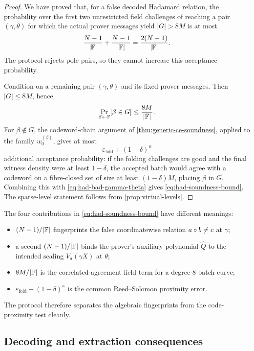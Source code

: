 \begin{proof}
We have proved that, for a false decoded Hadamard relation, the probability over the first two unrestricted field challenges of reaching a pair $(\gamma,\theta)$ for which the actual prover messages yield $|G|>8M$ is at most
\begin{equation}
  \frac{N-1}{|\mathbb{F}|}+\frac{N-1}{|\mathbb{F}|}
  =\frac{2(N-1)}{|\mathbb{F}|}.
  \label{eq:had-bad-gamma-theta}
\end{equation}
The protocol rejects pole pairs, so they cannot increase this acceptance probability.

Condition on a remaining pair $(\gamma,\theta)$ and its fixed prover messages.  Then $|G|\le8M$, hence
\[
  \Pr_{\beta\leftarrow\mathbb{F}}[\beta\in G]\le\frac{8M}{|\mathbb{F}|}.
\]
For $\beta\notin G$, the codeword-chain argument of \cref{thm:generic-ce-soundness}, applied to the family $w_0^{(\beta)}$, gives at most
\[
  \varepsilon_{\mathrm{fold}}+(1-\delta)^\kappa
\]
additional acceptance probability: if the folding challenges are good and the final witness density were at least $1-\delta$, the accepted batch would agree with a codeword on a fibre-closed set of size at least $(1-\delta)M$, placing $\beta$ in $G$.  Combining this with \eqref{eq:had-bad-gamma-theta} gives \eqref{eq:had-soundness-bound}.  The sparse-level statement follows from \cref{prop:virtual-levels}.
\end{proof}

\begin{remark}
\label{rem:had-error-terms}
The four contributions in \eqref{eq:had-soundness-bound} have different meanings:
\begin{itemize}[leftmargin=*]
  \item $(N-1)/|\mathbb{F}|$ fingerprints the false coordinatewise relation $a\circ b\ne c$ at $\gamma$;
  \item a second $(N-1)/|\mathbb{F}|$ binds the prover's auxiliary polynomial $\widehat Q$ to the intended scaling $V_a(\gamma X)$ at $\theta$;
  \item $8M/|\mathbb{F}|$ is the correlated-agreement field term for a degree-$8$ batch curve;
  \item $\varepsilon_{\mathrm{fold}}+(1-\delta)^\kappa$ is the common Reed--Solomon proximity error.
\end{itemize}
The protocol therefore separates the algebraic fingerprints from the code-proximity test cleanly.
\end{remark}

\subsection{Decoding and extraction consequences}
\label{sec:hadamard-extraction}

